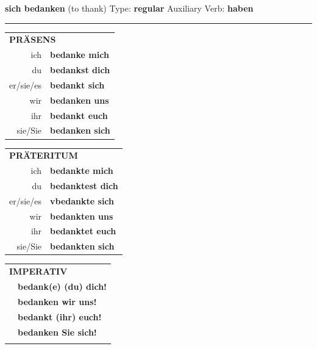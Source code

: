 \documentclass[10pt,a4paper]{revtex4-2}
\begin{document}
\begin{verbbox}
        {\Large \bf sich bedanken} (to thank) \hfill Type: \textbf{regular} \hfill Auxiliary Verb: \textbf{haben} 
    
       \vspace{5pt}

    \hrule
    
    \vspace{5pt}

  \begin{tabular}{rl}
     \multicolumn{2}{l}{\textbf{PRÄSENS} }\\
    ich & \textbf{bedanke mich}\\
    du & \textbf{bedankst dich}\\
    er/sie/es & \textbf{bedankt sich}\\
    wir & \textbf{bedanken uns}\\
    ihr & \textbf{bedankt euch}\\
    sie/Sie & \textbf{bedanken sich}\\
  \end{tabular}
  \hfill
     \begin{tabular}{rl}
    \multicolumn{2}{l}{\textbf{PRÄTERITUM} }\\
    ich & \textbf{bedankte mich}\\
    du & \textbf{bedanktest dich}\\
    er/sie/es & \textbf{vbedankte sich}\\
    wir & \textbf{bedankten uns}\\
    ihr & \textbf{bedanktet euch}\\
    sie/Sie & \textbf{bedankten sich}\\
  \end{tabular}
  \hfill
  \begin{tabular}{rl}
     \multicolumn{2}{l}{\textbf{IMPERATIV} }\\
   & \textbf{bedank(e) (du) dich!}\\
   & \textbf{bedanken wir uns!}\\
   & \textbf{bedankt (ihr) euch!}\\
   & \textbf{bedanken Sie sich!}\\
   & \vspace{10pt}
  \end{tabular}

    \vspace{10pt}


\end{verbbox}
\end{document}
